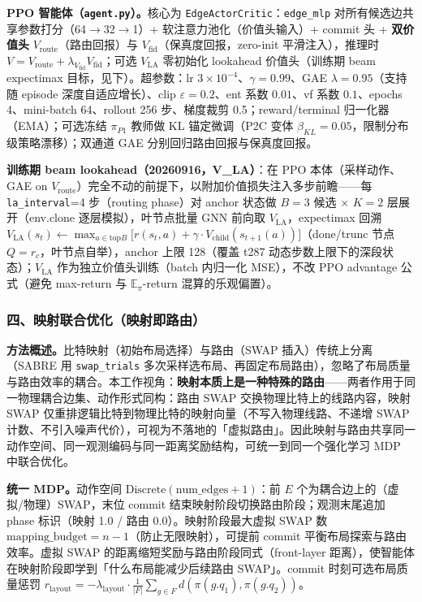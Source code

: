 \textbf{PPO 智能体（\texttt{agent.py}）。}核心为 \texttt{EdgeActorCritic}：\texttt{edge\_mlp} 对所有候选边共享参数打分（64$\to$32$\to$1）+ 软注意力池化（价值头输入）+ commit 头 + \textbf{双价值头} $V_{\mathrm{route}}$（路由回报）与 $V_{\mathrm{fid}}$（保真度回报，zero-init 平滑注入），推理时 $V=V_{\mathrm{route}}+\lambda_{V_{\mathrm{fid}}}V_{\mathrm{fid}}$；可选 $V_{\mathrm{LA}}$ 零初始化 lookahead 价值头（训练期 beam expectimax 目标，见下）。超参数：lr $3\times10^{-4}$、$\gamma=0.99$、GAE $\lambda=0.95$（支持随 episode 深度自适应增长）、clip $\varepsilon=0.2$、ent 系数 $0.01$、vf 系数 $0.1$、epochs 4、mini-batch 64、rollout 256 步、梯度裁剪 0.5；reward/terminal 归一化器（EMA）；可选冻结 $\pi_{P1}$ 教师做 KL 锚定微调（P2C 变体 $\beta_{KL}=0.05$，限制分布级策略漂移）；双通道 GAE 分别回归路由回报与保真度回报。

\textbf{训练期 beam lookahead（20260916，V\_LA）}：在 PPO 本体（采样动作、GAE on $V_{\mathrm{route}}$）完全不动的前提下，以附加价值损失注入多步前瞻——每 \texttt{la\_interval}=4 步（routing phase）对 anchor 状态做 $B{=}3$ 候选 $\times$ $K{=}2$ 层展开（env.clone 逐层模拟），叶节点批量 GNN 前向取 $V_{\mathrm{LA}}$，expectimax 回溯 $V_{\mathrm{LA}}(s_t)\leftarrow\max_{a\in\mathrm{top}B}\big[r(s_t,a)+\gamma\cdot V_{\mathrm{child}}(s_{t+1}(a))\big]$（done/trunc 节点 $Q=r_c$，叶节点自举），anchor 上限 128（覆盖 t287 动态步数上限下的深段状态）；$V_{\mathrm{LA}}$ 作为独立价值头训练（batch 内归一化 MSE），不改 PPO advantage 公式（避免 max-return 与 $\mathbb{E}_\pi$-return 混算的乐观偏置）。


\subsubsection{四、映射联合优化（映射即路由）}

\textbf{方法概述。}比特映射（初始布局选择）与路由（SWAP 插入）传统上分离（SABRE 用 \texttt{swap\_trials} 多次采样选布局、再固定布局路由），忽略了布局质量与路由效率的耦合。本工作视角：\textbf{映射本质上是一种特殊的路由}——两者作用于同一物理耦合边集、动作形式同构：路由 SWAP 交换物理比特上的线路内容，映射 SWAP 仅重排逻辑比特到物理比特的映射向量（不写入物理线路、不递增 SWAP 计数、不引入噪声代价），可视为不落地的「虚拟路由」。因此映射与路由共享同一动作空间、同一观测编码与同一距离奖励结构，可统一到同一个强化学习 MDP 中联合优化。

\textbf{统一 MDP。}动作空间 $\mathrm{Discrete}(\mathrm{num\_edges}+1)$：前 $E$ 个为耦合边上的（虚拟/物理）SWAP，末位 commit 结束映射阶段切换路由阶段；观测末尾追加 phase 标识（映射 1.0 / 路由 0.0）。映射阶段最大虚拟 SWAP 数 $\mathrm{mapping\_budget}=n-1$（防止无限映射），可提前 commit 平衡布局探索与路由效率。虚拟 SWAP 的距离缩短奖励与路由阶段同式（front-layer 距离），使智能体在映射阶段即学到「什么布局能减少后续路由 SWAP」。commit 时刻可选布局质量惩罚 $r_{\mathrm{layout}}=-\lambda_{\mathrm{layout}}\cdot\frac1{|F|}\sum_{g\in F}d(\pi(g.q_1),\pi(g.q_2))$。

